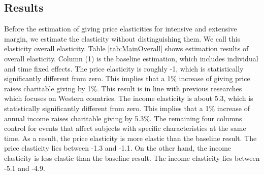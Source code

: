 \documentclass[
  11pt,
  a4paper,
]{article}
\begin{document}
\hypertarget{results}{%
\subsection{Results}\label{results}}

Before the estimation of giving price elasticities for intensive and extensive margin,
we estimate the elasticity without distinguishing them.
We call this elasticity overall elasticity.
Table \ref{tab:MainOverall} shows estimation results of overall elasticity.
Column (1) is the baseline estimation, which includes individual and time fixed effects.
The price elasticity is roughly -1, which is statistically significantly different from zero.
This implies that a 1\% increase of giving price raises charitable giving by 1\%.
This result is in line with previous researches which focuses on Western countries.
The income elasticity is about 5.3, which is statistically significantly different from zero.
This implies that a 1\% increase of annual income raises charitable giving by 5.3\%.
The remaining four columns control for events that affect subjects with specific characteristics at the same time.
As a result, the price elasticity is more elastic than the baseline result.
The price elasticity lies between -1.3 and -1.1.
On the other hand, the income elasticity is less elastic than the baseline result.
The income elasticity lies between -5.1 and -4.9.
\end{document}
